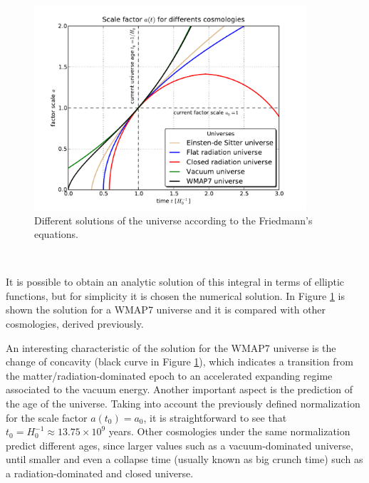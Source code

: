 \
\begin{figure}[htbp]
	\centering
	\includegraphics[width=0.9\textwidth]
	{./figures/2_theoretical_framework/Friedmann_Solution.pdf}

	\caption{\small{Different solutions of the universe according to the
	Friedmann's equations.}}
	
	\label{fig:Cosmologies}
\end{figure}
\

It is possible to obtain an analytic solution of this integral in terms of
elliptic functions, but for simplicity it is chosen the numerical solution.
In Figure \ref{fig:Cosmologies} is shown the solution for a WMAP7 
universe and it is compared with other cosmologies, derived previously.


An interesting characteristic of the solution for the WMAP7 universe is 
the change of concavity (black curve in Figure \ref{fig:Cosmologies}), 
which indicates a transition from the matter/radiation-dominated epoch
to an accelerated expanding regime associated to the vacuum energy.
Another important aspect is the prediction of the age of the universe.
Taking into account the previously defined normalization for the scale
factor $a(t_0) = a_0$, it is straightforward to see that $t_0 = H_0^{-1} 
\approx 13.75 \times 10^9$ years. Other cosmologies under the same 
normalization predict different ages, since larger values such as a 
vacuum-dominated universe, until smaller and even a collapse time (usually
known as big crunch time) such as a radiation-dominated and closed 
universe.



